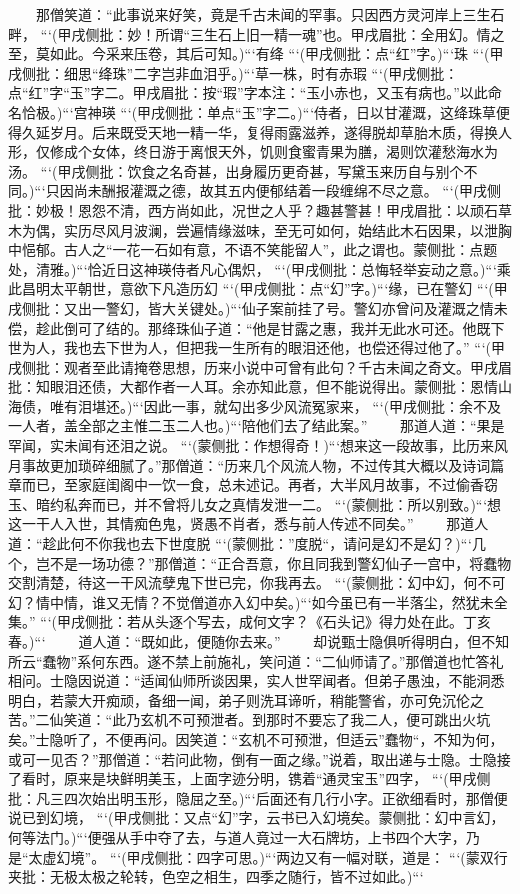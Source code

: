 \documentclass[
    ref = refDemo.bib,
    coverpage = cover.pdf,
    geometry = b5,
    lang = cn
]{spBook}
\begin{document}
    　　那僧笑道：“此事说来好笑，竟是千古未闻的罕事。只因西方灵河岸上三生石畔， ```(甲戌侧批：妙！所谓“三生石上旧一精一魂”也。甲戌眉批：全用幻。情之至，莫如此。今采来压卷，其后可知。)```有绛 ```(甲戌侧批：点“红”字。)```珠 ```(甲戌侧批：细思“绛珠”二字岂非血泪乎。)```草一株，时有赤瑕 ```(甲戌侧批：点“红”字“玉”字二。甲戌眉批：按“瑕”字本注：“玉小赤也，又玉有病也。”以此命名恰极。)```宫神瑛 ```(甲戌侧批：单点“玉”字二。)```侍者，日以甘灌溉，这绛珠草便得久延岁月。后来既受天地一精一华，复得雨露滋养，遂得脱却草胎木质，得换人形，仅修成个女体，终日游于离恨天外，饥则食蜜青果为膳，渴则饮灌愁海水为汤。 ```(甲戌侧批：饮食之名奇甚，出身履历更奇甚，写黛玉来历自与别个不同。)```只因尚未酬报灌溉之德，故其五内便郁结着一段缠绵不尽之意。 ```(甲戌侧批：妙极！恩怨不清，西方尚如此，况世之人乎？趣甚警甚！甲戌眉批：以顽石草木为偶，实历尽风月波澜，尝遍情缘滋味，至无可如何，始结此木石因果，以泄胸中悒郁。古人之“一花一石如有意，不语不笑能留人”，此之谓也。蒙侧批：点题处，清雅。)```恰近日这神瑛侍者凡心偶炽， ```(甲戌侧批：总悔轻举妄动之意。)```乘此昌明太平朝世，意欲下凡造历幻 ```(甲戌侧批：点“幻”字。)```缘，已在警幻 ```(甲戌侧批：又出一警幻，皆大关键处。)```仙子案前挂了号。警幻亦曾问及灌溉之情未偿，趁此倒可了结的。那绛珠仙子道：“他是甘露之惠，我并无此水可还。他既下世为人，我也去下世为人，但把我一生所有的眼泪还他，也偿还得过他了。” ```(甲戌侧批：观者至此请掩卷思想，历来小说中可曾有此句？千古未闻之奇文。甲戌眉批：知眼泪还债，大都作者一人耳。余亦知此意，但不能说得出。蒙侧批：恩情山海债，唯有泪堪还。)```因此一事，就勾出多少风流冤家来， ```(甲戌侧批：余不及一人者，盖全部之主惟二玉二人也。)```陪他们去了结此案。”  
    　　那道人道：“果是罕闻，实未闻有还泪之说。 ```(蒙侧批：作想得奇！)```想来这一段故事，比历来风月事故更加琐碎细腻了。”那僧道：“历来几个风流人物，不过传其大概以及诗词篇章而已，至家庭闺阁中一饮一食，总未述记。再者，大半风月故事，不过偷香窃玉、暗约私奔而已，并不曾将儿女之真情发泄一二。 ```(蒙侧批：所以别致。)```想这一干人入世，其情痴色鬼，贤愚不肖者，悉与前人传述不同矣。”  
    　　那道人道：“趁此何不你我也去下世度脱 ```(蒙侧批：”度脱“，请问是幻不是幻？)```几个，岂不是一场功德？”那僧道：“正合吾意，你且同我到警幻仙子一宫中，将蠢物交割清楚，待这一干风流孽鬼下世已完，你我再去。 ```(蒙侧批：幻中幻，何不可幻？情中情，谁又无情？不觉僧道亦入幻中矣。)```如今虽已有一半落尘，然犹未全集。” ```(甲戌侧批：若从头逐个写去，成何文字？《石头记》得力处在此。丁亥春。)```  
    　　道人道：“既如此，便随你去来。”  
    　　却说甄士隐俱听得明白，但不知所云“蠢物”系何东西。遂不禁上前施礼，笑问道：“二仙师请了。”那僧道也忙答礼相问。士隐因说道：“适闻仙师所谈因果，实人世罕闻者。但弟子愚浊，不能洞悉明白，若蒙大开痴顽，备细一闻，弟子则洗耳谛听，稍能警省，亦可免沉伦之苦。”二仙笑道：“此乃玄机不可预泄者。到那时不要忘了我二人，便可跳出火坑矣。”士隐听了，不便再问。因笑道：“玄机不可预泄，但适云”蠢物“，不知为何，或可一见否？”那僧道：“若问此物，倒有一面之缘。”说着，取出递与士隐。士隐接了看时，原来是块鲜明美玉，上面字迹分明，镌着“通灵宝玉”四字， ```(甲戌侧批：凡三四次始出明玉形，隐屈之至。)```后面还有几行小字。正欲细看时，那僧便说已到幻境， ```(甲戌侧批：又点“幻”字，云书已入幻境矣。蒙侧批：幻中言幻，何等法门。)```便强从手中夺了去，与道人竟过一大石牌坊，上书四个大字，乃是“太虚幻境”。 ```(甲戌侧批：四字可思。)```两边又有一幅对联，道是： ```(蒙双行夹批：无极太极之轮转，色空之相生，四季之随行，皆不过如此。)```  
\end{document}
